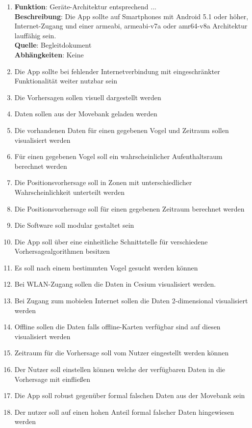 \documentclass[12pt]{article} %
\begin{document}
\begin{enumerate}[(R1)]
		\item 
		\textbf{Funktion}: Geräte-Architektur entsprechend ... \\
		\textbf{Beschreibung}:  Die App sollte auf Smartphones mit Android 5.1 oder höher, Internet-Zugang und einer armeabi, armeabi-v7a oder amr64-v8a Architektur lauffähig sein. \\
		\textbf{Quelle}:  Begleitdokument \\
		\textbf{Abhängkeiten}: Keine

		\item Die App sollte bei fehlender Internetverbindung mit eingeschränkter Funktionalität weiter nutzbar sein
		\item Die Vorhersagen sollen visuell dargestellt werden
		\item Daten sollen aus der Movebank geladen werden
		\item Die vorhandenen Daten für einen gegebenen Vogel und Zeitraum sollen visualisiert werden
		\item Für einen gegebenen Vogel soll ein wahrscheinlicher Aufenthaltsraum berechnet werden
		\item Die Positionsvorhersage soll in Zonen mit unterschiedlicher Wahrscheinlichkeit unterteilt werden
		\item Die Positionsvorhersage soll für einen gegebenen Zeitraum berechnet werden
		\item Die Software soll modular gestaltet sein
		\item Die App soll über eine einheitliche Schnittstelle für verschiedene Vorhersagealgorithmen besitzen
		\item Es soll nach einem bestimmten Vogel gesucht werden können
		\item Bei WLAN-Zugang sollen die Daten in Cesium visualisiert werden.
		\item Bei Zugang zum mobielen Internet sollen die Daten 2-dimensional visualisiert werden
		\item Offline sollen die Daten falls offline-Karten verfügbar sind auf diesen visualisiert werden
		\item Zeitraum für die Vorhersage soll vom Nutzer eingestellt werden können
		\item Der Nutzer soll einstellen können welche der verfügbaren Daten in die Vorhersage mit einfließen
		\item Die App soll robust gegenüber formal falschen Daten aus der Movebank sein
		\item Der nutzer soll auf einen hohen Anteil formal falscher Daten hingewiesen werden

\end{enumerate}
\end{document}
